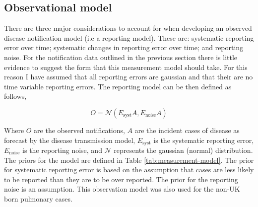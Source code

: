 \documentclass[11pt,twoside]{bristolthesis}
\begin{document}
  \hypertarget{observational-model}{%
  \subsection{Observational model}\label{observational-model}}
  
  There are three major considerations to account for when developing an observed disease notification model (i.e a reporting model). These are: systematic reporting error over time; systematic changes in reporting error over time; and reporting noise. For the notification data outlined in the previous section there is little evidence to suggest the form that this measurement model should take. For this reason I have assumed that all reporting errors are gaussian and that their are no time variable reporting errors. The reporting model can be then defined as follows,
  
  \[O = \mathcal{N}\left(E_{\text{syst}}A, E_{\text{noise}}A\right)\]
  
  Where \(O\) are the observed notifications, \(A\) are the incident cases of disease as forecast by the disease transmission model, \(E_{\text{syst}}\) is the systematic reporting error, \(E_{\text{noise}}\) is the reporting noise, and \(\mathcal{N}\) represents the gaussian (normal) distribution. The priors for the model are defined in Table \ref{tab:measurement-model}. The prior for systematic reporting error is based on the assumption that cases are less likely to be reported than they are to be over reported. The prior for the reporting noise is an assumption. This observation model was also used for the non-UK born pulmonary cases.
  
\end{document}
